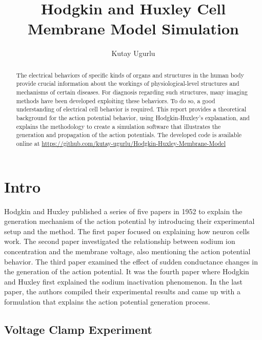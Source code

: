 \documentclass{IEEEtran}
\title{Hodgkin and Huxley Cell Membrane Model Simulation}
\author{Kutay Ugurlu}
\begin{document}
\maketitle
\begin{abstract}
    The electrical behaviors of specific kinds of organs and structures in the human body provide crucial information about the workings of physiological-level structures and mechanisms of certain diseases. For diagnosis regarding such structures, many imaging methods have been developed exploiting these behaviors. To do so, a good understanding of electrical cell behavior is required. This report provides a theoretical background for the action potential behavior, using Hodgkin-Huxley's explanation, and explains the methodology to create a simulation software that illustrates the generation and propagation of the action potentials. The developed code is available online at \href{https://github.com/kutay-ugurlu/Hodgkin-Huxley-Membrane-Model}{https://github.com/kutay-ugurlu/Hodgkin-Huxley-Membrane-Model}
\end{abstract}
\section{Intro}
Hodgkin and Huxley \cite{hodgkin1952quantitative} published a series of five papers in 1952 to explain the generation mechanism of the action potential by introducing their experimental setup and the method. The first paper focused on explaining how neuron cells work. The second paper investigated the relationship between sodium ion concentration and the membrane voltage, also mentioning the action potential behavior. The third paper examined the effect of sudden conductance changes in the generation of the action potential. It was the fourth paper where Hodgkin and Huxley first explained the sodium inactivation phenomenon. In the last paper, the authors compiled their experimental results and came up with a formulation that explains the action potential generation process. 

\subsection{Voltage Clamp Experiment}
\end{document}
